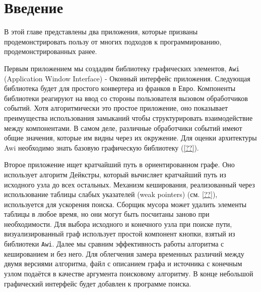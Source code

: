 \section{Введение}
\label{sec:intro_13}

В этой главе представлены два приложения, которые призваны продемонстрировать
пользу от многих подходов к программированию, продемонстрированных ранее.

Первым приложением мы создадим библиотеку графических элементов, \texttt{Awi} 
(Application Window Interface) - Оконный интерфейс приложения. Следующая 
библиотека будет для простого конвертера из франков в Евро. Компоненты 
библиотеки реагируют на ввод со стороны пользователя вызовом обработчиков 
событий. Хотя алгоритмически это простое приложение, оно показывает 
преимущества 
использования замыканий чтобы структурировать взаимодействие между 
компонентами. 
В самом деле, различные обработчики событий имеют общие значения, которые им 
видны через их окружение. Для оценки архитектуры Awi необходимо знать базовую 
графическую библиотеку (\ref{??}).

Второе приложение ищет кратчайший путь в ориентированном графе. Оно использует 
алгоритм Дейкстры, который вычисляет кратчайший путь из исходного узла до всех 
остальных. Механизм кеширования, реализованный через использование таблицы 
слабых указателей (weak pointers) (см. \ref{??}), используется для ускорения 
поиска. Сборщик мусора может удалить элементы таблицы в любое время, но они 
могут быть посчитаны заново при необходимости. Для выбора исходного и 
конечного узла при поиске пути, визуализированный граф использует  простой 
компонент кнопки, взятый из библиотеки \texttt{Awi}. Далее мы сравним 
эффективность работы алгоритма с кешированием и без него. Для облегчения замера 
временных различий между двумя версиями алгоритма, файл с описанием графа и 
источника с конечным узлом подаётся в качестве аргумента поисковому алгоритму. 
В конце небольшой графический интерфейс будет добавлен к программе поиска.
